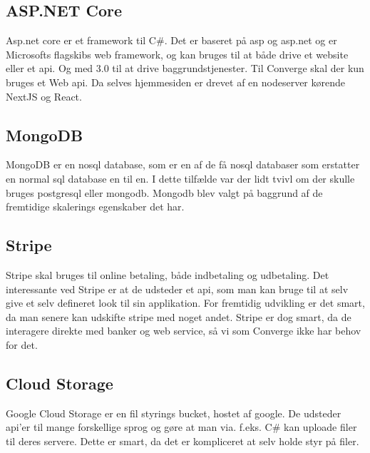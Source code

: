 \subsection{ASP.NET Core}

Asp.net core er et framework til C\#. Det er baseret på asp og asp.net og er Microsofts flagskibs web framework, og kan bruges til at både drive et website eller et api. Og med 3.0 til at drive baggrundstjenester. Til Converge skal der kun bruges et Web api. Da selves hjemmesiden er drevet af en nodeserver kørende NextJS og React.

\subsection{MongoDB}

MongoDB er en nosql database, som er en af de få nosql databaser som erstatter en normal sql database en til en. I dette tilfælde var der lidt tvivl om der skulle bruges postgresql eller mongodb. Mongodb blev valgt på baggrund af de fremtidige skalerings egenskaber det har.

\subsection{Stripe}

Stripe skal bruges til online betaling, både indbetaling og udbetaling. Det interessante ved Stripe er at de udsteder et api, som man kan bruge til at selv give et selv defineret look til sin applikation. For fremtidig udvikling er det smart, da man senere kan udskifte stripe med noget andet. Stripe er dog smart, da de interagere direkte med banker og web service, så vi som Converge ikke har behov for det.

\subsection{Cloud Storage}

Google Cloud Storage er en fil styrings bucket, hostet af google. De udsteder api'er til mange forskellige sprog og gøre at man via. f.eks. C\# kan uploade filer til deres servere. Dette er smart, da det er kompliceret at selv holde styr på filer.